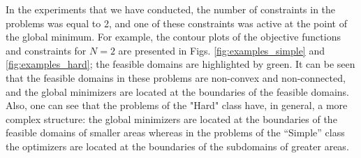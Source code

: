 \documentclass[review]{elsarticle}
\begin{document}
	In the experiments that we have conducted, the number of constraints in the problems was equal to 2, and one of these constraints was active at the point of the global minimum. For example, the contour plots of the objective functions and constraints for $N=2$ are presented in Figs. \ref{fig:examples_simple} and \ref{fig:examples_hard}; the feasible domains are highlighted by green. It can be seen that the feasible domains in these problems are non-convex and non-connected, and the global minimizers are located at the boundaries of the feasible domains. Also, one can see that the problems of the "Hard" class have, in general, a more complex structure: the global minimizers are located at the boundaries of the feasible domains of smaller areas whereas in the problems of the “Simple” class the optimizers are located at the boundaries of the subdomains of greater areas.
	
\end{document}
